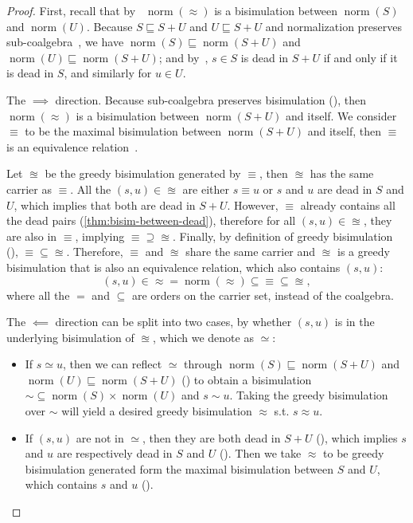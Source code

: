 \documentclass[conference]{IEEEtran}
\DeclareMathOperator{\norm}{\mathrm{norm}}
\begin{document}
\begin{proof}
    First, recall that by~ \(\norm(≈)\) is a bisimulation between \(\norm(S)\) and \(\norm(U)\).
    Because \(S ⊑ S + U\) and \(U ⊑ S + U\) and normalization preserves sub-coalgebra~, we have \(\norm(S) ⊑ \norm(S + U)\) and \(\norm(U) ⊑ \norm(S + U)\); and by~, \(s ∈ S\) is dead in \(S + U\) if and only if it is dead in \(S\), and similarly for \(u ∈ U\).

    The \(⟹\) direction. 
    Because sub-coalgebra preserves bisimulation (), then \(\norm(≈)\) is a bisimulation between \(\norm(S + U)\) and itself.
    We consider \(≡\) to be the maximal bisimulation between \(\norm(S + U)\) and itself, then \(≡\) is an equivalence relation~\cite[Corollary 5.6]{rutten_UniversalCoalgebraTheory_2000}.

    Let \(≊\) be the greedy bisimulation generated by \(≡\), then \(≊\) has the same carrier as \(≡\).
    All the \((s, u) ∈ {≊}\) are either \(s ≡ u\) or \(s\) and \(u\) are dead in \(S\) and \(U\), which implies that both are dead in \(S + U\).
    However, \(≡\) already contains all the dead pairs (\cref{thm:bisim-between-dead}), therefore for all \((s, u) ∈ {≊}\), they are also in \(≡\), implying \({≡} ⊇ {≊}\).
    Finally, by definition of greedy bisimulation (), \({≡} ⊆ {≊}\).
    Therefore, \(≡\) and \(≊\) share the same carrier and \(≊\) is a greedy bisimulation that is also an equivalence relation, which also contains \((s, u)\):
    \[(s, u) ∈ {≈} = \norm(≈) ⊆ {≡} ⊆ {≊},\]
    where all the \(=\) and \(⊆\) are orders on the carrier set, instead of the coalgebra.

    The \(⟸\) direction can be split into two cases, by whether \((s, u)\) is in the underlying bisimulation of \(≊\), which we denote as \(≃\): 
    \begin{itemize}
        \item If \(s ≃ u\), then we can reflect \(≃\)  through \(\norm(S) ⊑ \norm(S + U)\) and \(\norm(U) ⊑ \norm(S + U)\) () to obtain a bisimulation \({∼} ⊆ \norm(S) × \norm(U)\) and \(s ∼ u\).
        Taking the greedy bisimulation over \(∼\) will yield a desired greedy bisimulation \(≈\) s.t. \(s ≈ u\).
        \item If \((s, u)\) are not in \(≃\), then they are both dead in \(S + U\) (), which implies \(s\) and \(u\) are respectively dead in \(S\) and \(U\) ().
        Then we take \(≈\) to be greedy bisimulation generated form the maximal bisimulation between \(S\) and \(U\), which contains \(s\) and \(u\) ().
        \qedhere
    \end{itemize}
\end{proof}
\end{document}
